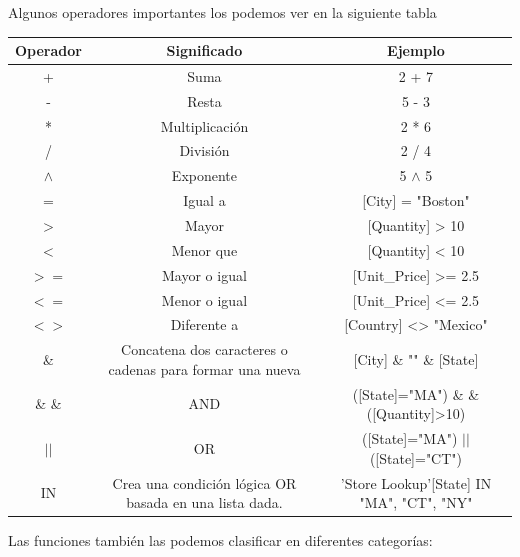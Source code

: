 Algunos operadores importantes los podemos ver en la siguiente tabla

\begin{table}[H]
    \centering
    \begin{tabular}{|c|c|c|}
        \hline
        Operador & Significado & Ejemplo\\ \hline
        + & Suma & 2 + 7 \\ \hline
        - & Resta & 5 - 3 \\ \hline
        * & Multiplicación & 2 * 6 \\ \hline
        / & División & 2 / 4 \\ \hline
        $\wedge$ & Exponente & 5 $\wedge$ 5 \\ \hline
        = & Igual a & [City] = "Boston"\\ \hline
        $>$ & Mayor & [Quantity] > 10\\ \hline
        $<$ & Menor que & [Quantity] < 10 \\ \hline
        $>=$ & Mayor o igual & [Unit\_Price] >= 2.5 \\ \hline
        $<=$ & Menor o igual & [Unit\_Price] <= 2.5 \\ \hline
        $<>$ & Diferente a & [Country] <> "Mexico" \\ \hline
        \& & Concatena dos caracteres o cadenas para formar una nueva & [City] \& "" \& [State] \\ \hline
        \& \& & AND & ([State]="MA") \& \& ([Quantity]>10) \\ \hline
        $||$ & OR & ([State]="MA") $||$ ([State]="CT") \\ \hline
        IN & Crea una condición lógica OR basada en una lista dada. & 'Store Lookup'[State] IN {"MA", "CT", "NY"} \\ \hline
    \end{tabular}
\end{table}


Las funciones también las podemos clasificar en diferentes categorías:

